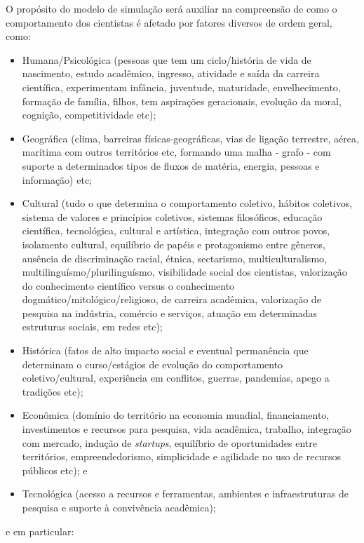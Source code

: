 O propósito do modelo de simulação será auxiliar na compreensão de como o comportamento dos cientistas 
é afetado por fatores diversos de ordem geral, como: 
\begin{itemize}
    \item Humana/Psicológica (pessoas que tem um ciclo/história de vida de nascimento, estudo acadêmico, ingresso, atividade e saída da carreira científica, experimentam infância, juventude, maturidade, envelhecimento, formação de família, filhos, tem aspirações geracionais, evolução da moral,  cognição\cite{sprouts_kohlberg_2019}, competitividade etc);
    \item Geográfica (clima, barreiras físicas-geográficas, vias de ligação terrestre, aérea, marítima com outros territórios etc, formando uma malha - grafo - com suporte a determinados tipos de fluxos de matéria, energia, pessoas e informação) etc;
    \item Cultural (tudo o que determina o comportamento coletivo, hábitos coletivos, sistema de valores e princípios coletivos, sistemas filosóficos, educação científica, tecnológica,  cultural e artística, integração com outros povos, isolamento cultural, equilíbrio de papéis e protagonismo entre gêneros, ausência de discriminação racial, étnica, sectarismo, multiculturalismo, multilinguísmo/plurilinguísmo,  visibilidade social dos cientistas, valorização do conhecimento científico versus o conhecimento dogmático/mitológico/religioso, de carreira acadêmica, valorização de pesquisa na indústria, comércio e serviços, atuação em determinadas estruturas sociais, em redes etc); 
    \item Histórica (fatos de alto impacto social e eventual permanência que determinam o curso/estágios de evolução do comportamento coletivo/cultural, experiência em conflitos, guerras, pandemias, apego a tradições etc); 
    \item Econômica (domínio do território na economia mundial, financiamento, investimentos e recursos para pesquisa, vida acadêmica, trabalho, integração com mercado, indução de \textit{startups}, equilíbrio de oportunidades entre territórios, empreendedorismo, simplicidade e agilidade no uso de recursos públicos etc); e
    \item Tecnológica (acesso a recursos e ferramentas, ambientes e infraestruturas de pesquisa e suporte à convivência acadêmica);
\end{itemize} 
e em particular:
